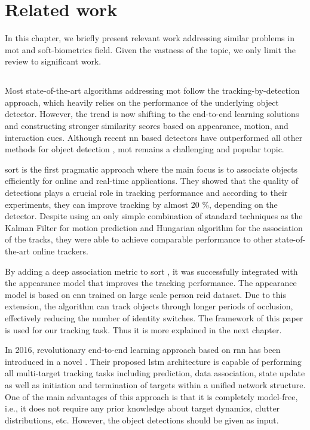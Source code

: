 \chapter{Related work}\label{related_work}
    In this chapter, we briefly present relevant work addressing similar problems in \gls{mot} and soft-biometrics field. Given the vastness of the topic, we only limit the review to significant work.

\section{}
     Most state-of-the-art algorithms addressing \gls{mot} follow the tracking-by-detection approach, which heavily relies on the performance of the underlying object detector. However, the trend is now shifting to the end-to-end learning solutions and constructing stronger similarity scores based on appearance, motion, and interaction cues. Although recent \gls{nn} based detectors have outperformed all other methods for object detection \cite{russakovsky2015imagenet, ren2015faster, redmon2016you}, \gls{mot} remains a challenging and popular topic.
   
    \Gls{sort} \cite{bewley2016simple} is the first pragmatic approach where the main focus is to associate objects efficiently for online and real-time applications. They showed that the quality of detections plays a crucial role in tracking performance and according to their experiments, they can improve tracking by almost 20 \%, depending on the detector. Despite using an only simple combination of standard techniques as the Kalman Filter for motion prediction and Hungarian algorithm for the association of the tracks, they were able to achieve comparable performance to other state-of-the-art online trackers. 
    
    By adding a deep association metric to \gls{sort} \cite{wojke2017simple}, it was successfully integrated with the appearance model that improves the tracking performance. The appearance model is based on \gls{cnn} trained on large scale person \gls{reid} dataset. Due to this extension, the algorithm can track objects through longer periods of occlusion, effectively reducing the number of identity switches. The framework of this paper is used for our tracking task. Thus it is more explained in the next chapter. 

    In 2016, revolutionary end-to-end learning approach based on \gls{rnn} \cite{mikolov2010recurrent} has been introduced in a novel \cite{milan2017online}. Their proposed \gls{lstm} \cite{hochreiter1997long} architecture is capable of performing all multi-target tracking tasks including prediction, data association, state update as well as initiation and termination of targets within a unified network structure. One of the main advantages of this approach is that it is completely model-free, i.e., it does not require any prior knowledge about target dynamics, clutter distributions, etc. However, the object detections should be given as input.
    
